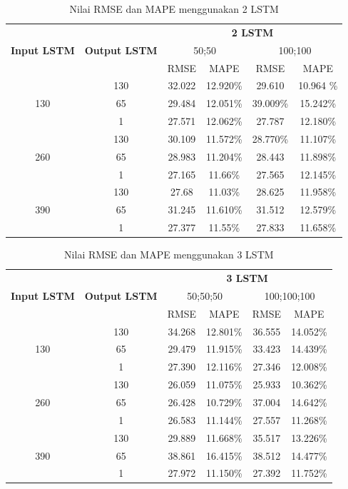 \documentclass[conference]{IEEEtran}
\begin{document}
\begin{table}[htp]
	\centering
	\begin{tabular}{|c|c|c|c|c|c|}
		\hline 
		\multirow{3}{*}{\textbf{Input LSTM}} & \multirow{3}{*}{\textbf{Output LSTM}} & \multicolumn{4}{c|}{\textbf{2 LSTM}} \\ \cline{3-6}
		&  & \multicolumn{2}{c|}{50;50}& \multicolumn{2}{c|}{100;100} \\ \cline{3-6}
		& & RMSE & MAPE& RMSE & MAPE\\
		\hline
		\multirow{3}{*}{130} & 130 & 32.022 & 12.920\% & 29.610 & 10.964 \%\\
		& 65 & 29.484 & 12.051\%& 39.009\% & 15.242\% \\
		& 1 & 27.571 & 12.062\% & 27.787 & 12.180\% \\
		\hline
		\multirow{3}{*}{260} & 130 & 30.109 & 11.572\% & 28.770\% & 11.107\% \\
		& 65 & 28.983 & 11.204\% & 28.443 & 11.898\% \\
		& 1 & 27.165 & 11.66\% & 27.565 & 12.145\% \\
		\hline
		\multirow{3}{*}{390} & 130 & 27.68 & 11.03\% & 28.625 & 11.958\% \\
		& 65 & 31.245 & 11.610\% & 31.512 & 12.579\% \\
		& 1 & 27.377 & 11.55\% & 27.833 & 11.658\% \\
		\hline
	\end{tabular}
	\caption{Nilai RMSE dan MAPE menggunakan 2 LSTM}
	\label{2LSTM_result}
	\end{table} 

\begin{table}[htp]
	\centering
	\begin{tabular}{|c|c|c|c|c|c|}
		\hline 
		\multirow{3}{*}{\textbf{Input LSTM}} & \multirow{3}{*}{\textbf{Output LSTM}} & \multicolumn{4}{c|}{\textbf{3 LSTM}} \\ \cline{3-6}
		&  & \multicolumn{2}{c|}{50;50;50}& \multicolumn{2}{c|}{100;100;100} \\ \cline{3-6}
		& & RMSE & MAPE& RMSE & MAPE\\
		\hline
		\multirow{3}{*}{130} & 130 & 34.268 & 12.801\% & 36.555 & 14.052\% \\
		& 65 & 29.479 & 11.915\% & 33.423 & 14.439\% \\
		& 1 & 27.390 & 12.116\% & 27.346 & 12.008\% \\
		\hline
		\multirow{3}{*}{260} & 130 & 26.059 & 11.075\% & 25.933 & 10.362\% \\
		& 65 & 26.428 & 10.729\% & 37.004 & 14.642\% \\
		& 1 & 26.583 & 11.144\% &  27.557 & 11.268\% \\
		\hline
		\multirow{3}{*}{390} & 130 & 29.889 & 11.668\% & 35.517 & 13.226\% \\
		& 65 & 38.861 & 16.415\% & 38.512 & 14.477\% \\
		& 1 & 27.972 & 11.150\% & 27.392 & 11.752\% \\
		\hline
	\end{tabular}
	\caption{Nilai RMSE dan MAPE menggunakan 3 LSTM}
	\label{3LSTM_result}
	\end{table} 
\end{document}
